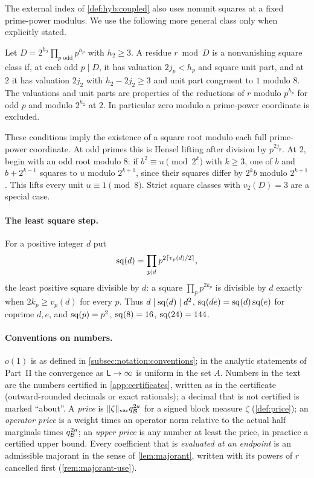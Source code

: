 The external index of \cref{def:hyb:coupled} also uses nonunit squares at a fixed prime-power
modulus. We use the following more general class only when explicitly stated.
\begin{definition}\label{def:nonvanishing-square-class}
Let $D=2^{h_2}\prod_{p\text{ odd}}p^{h_p}$ with $h_2\ge3$.
A residue $r\bmod D$ is a nonvanishing square class if, at each odd
$p\mid D$, it has valuation $2j_p<h_p$ and square unit part, and at $2$
it has valuation $2j_2$ with $h_2-2j_2\ge3$ and unit part congruent
to $1$ modulo $8$. The valuations and unit parts are properties of the
reductions of $r$ modulo $p^{h_p}$ for odd $p$ and modulo $2^{h_2}$ at $2$. In particular zero modulo a
prime-power coordinate is excluded.
\end{definition}
These conditions imply the existence of a square root modulo each full
prime-power coordinate. At odd primes this is Hensel lifting after
division by $p^{2j_p}$. At $2$, begin with an odd root modulo $8$: if
$b^2\equiv u\pmod{2^k}$ with $k\ge3$, one of $b$ and $b+2^{k-1}$
squares to $u$ modulo $2^{k+1}$, since their squares differ by
$2^kb$ modulo $2^{k+1}$. This lifts every unit $u\equiv1\pmod8$.
Strict square classes with $v_2(D)=3$ are a special case.

\paragraph{The least square step.}
For a positive integer $d$ put
\begin{equation}\label{eq:sq}
 \operatorname{sq}(d)=\prod_{p\mid d}p^{2\lceil v_p(d)/2\rceil},
\end{equation}
the least positive square divisible by $d$: a square $\prod_pp^{2k_p}$ is
divisible by $d$ exactly when $2k_p\ge v_p(d)$ for every $p$. Thus
$d\mid\operatorname{sq}(d)\mid d^2$, $\operatorname{sq}(de)=\operatorname{sq}(d)\operatorname{sq}(e)$ for coprime $d,e$, and
$\operatorname{sq}(p)=p^2$, $\operatorname{sq}(8)=16$, $\operatorname{sq}(24)=144$.

\paragraph{Conventions on numbers.}
$o(1)$ is as defined in \cref{subsec:notation:conventions}; in
the analytic statements of Part~II the convergence as
$\mathsf L\to\infty$ is uniform in the set $A$. Numbers in the text
are the numbers certified in \cref{app:certificates}, written as in the
certificate (outward-rounded decimals or exact rationals); a decimal that is
not certified is marked ``about''. A \emph{price} is $\|\zeta\|_{\rm
var}q_{\mathcal B}^{2a}$ for a signed block measure $\zeta$ (\cref{def:price}); an
\emph{operator price} is a weight times an operator norm relative to the
actual half marginals times $q_{\mathcal B}^{2a}$; an \emph{upper price} is any
number at least the price, in practice a certified upper bound. Every coefficient that is
\emph{evaluated at an endpoint} is an admissible majorant in the sense of
\cref{lem:majorant}, written with its powers of $r$ cancelled first
(\cref{rem:majorant-use}).

